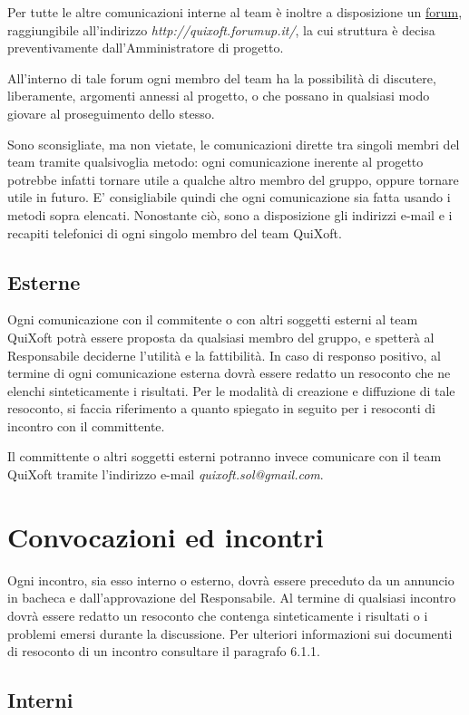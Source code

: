 \documentclass[11pt,a4paper]{article}
\begin{document}
Per tutte le altre comunicazioni interne al team è inoltre a disposizione un \underline{forum}, raggiungibile all'indirizzo \textit{http://quixoft.forumup.it/}, la cui struttura è decisa preventivamente dall'Amministratore di progetto.

All'interno di tale forum ogni membro del team ha la possibilità di discu\-tere, liberamente, argomenti annessi al
progetto, o che possano in qualsiasi modo giovare al proseguimento dello stesso.

Sono sconsigliate, ma non vietate, le comunicazioni dirette tra singoli membri del team tramite qualsivoglia metodo: ogni comunicazione ineren\-te al progetto potrebbe infatti tornare utile a qualche altro membro del gruppo, oppure tornare utile in futuro.
E' consigliabile quindi che ogni comunicazione sia fatta usando i metodi sopra elencati.
Nonostante ciò, sono a disposizione gli indirizzi e-mail e i recapiti telefonici di ogni singolo membro del team QuiXoft.
\subsection{Esterne}
Ogni comunicazione con il commitente o con altri soggetti esterni al team QuiXoft potrà essere proposta da qualsiasi membro del gruppo, e spetterà al Responsabile deciderne l'utilità e la fattibilità.
In caso di responso positivo, al termine di ogni comunicazione esterna dovrà essere redatto un resoconto che ne elenchi sinteticamente i risultati. Per le modalità di creazione e diffuzione di tale resoconto, si faccia riferimento a quanto spiegato in seguito per i resoconti di incontro con il committente.

Il committente o altri soggetti esterni potranno invece comunicare con il team QuiXoft tramite l'indirizzo e-mail \textit{quixoft.sol@gmail.com}.
\section{Convocazioni ed incontri}
Ogni incontro, sia esso interno o esterno, dovrà essere preceduto da un annuncio in bacheca e dall'approvazione del Responsabile.
Al termine di qualsiasi incontro dovrà essere redatto un resoconto che contenga sinteticamente i risultati o i problemi emersi durante la discussione.
Per ulteriori informazioni sui documenti di resoconto di un incontro consultare il paragrafo 6.1.1.
\subsection{Interni}
\end{document}
